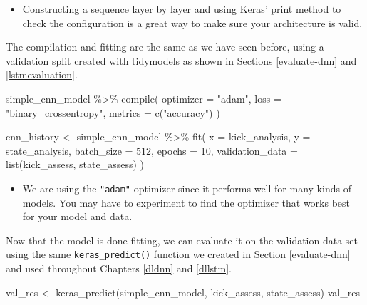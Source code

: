 \documentclass[
]{krantz}
\makeatletter
\newenvironment{Shaded}{\begin{snugshade}}{\end{snugshade}}
\newcommand{\AttributeTok}[1]{\textcolor[rgb]{0.77,0.63,0.00}{#1}}
\newcommand{\DecValTok}[1]{\textcolor[rgb]{0.00,0.00,0.81}{#1}}
\newcommand{\FunctionTok}[1]{\textcolor[rgb]{0.00,0.00,0.00}{#1}}
\newcommand{\NormalTok}[1]{#1}
\newcommand{\OtherTok}[1]{\textcolor[rgb]{0.56,0.35,0.01}{#1}}
\newcommand{\SpecialCharTok}[1]{\textcolor[rgb]{0.00,0.00,0.00}{#1}}
\newcommand{\StringTok}[1]{\textcolor[rgb]{0.31,0.60,0.02}{#1}}
\newenvironment{kframe}{%
\medskip{}
\setlength{\fboxsep}{.8em}
 \def\at@end@of@kframe{}%
 \ifinner\ifhmode%
  \def\at@end@of@kframe{\end{minipage}}%
  \begin{minipage}{\columnwidth}%
 \fi\fi%
 \def\FrameCommand##1{\hskip\@totalleftmargin \hskip-\fboxsep
 \colorbox{shadecolor}{##1}\hskip-\fboxsep
     \hskip-\linewidth \hskip-\@totalleftmargin \hskip\columnwidth}%
 \MakeFramed {\advance\hsize-\width
   \@totalleftmargin\z@ \linewidth\hsize
   \@setminipage}}%
 {\par\unskip\endMakeFramed%
 \at@end@of@kframe}
\renewenvironment{Shaded}{\begin{kframe}}{\end{kframe}}
\newenvironment{rmdblock}[1]
  {\begin{shaded*}
  \begin{itemize}[left = -1cm, labelsep = 1cm]
  \renewcommand{\labelitemi}{
    \raisebox{-.7\height}[0pt][0pt]{
      {\setkeys{Gin}{width=3em,keepaspectratio}\texttt{[image: images/\#1]}}
    }
  }
 
  \item
  }
  {
  \end{itemize}
  \end{shaded*}
  }
\newenvironment{rmdnote}
  {\begin{rmdblock}{note}}
  {\end{rmdblock}}
\makeatother
\begin{document}
\begin{rmdnote}
Constructing a sequence layer by layer and using Keras' print method to
check the configuration is a great way to make sure your architecture is
valid.
\end{rmdnote}

The compilation and fitting are the same as we have seen before, using a validation split created with tidymodels as shown in Sections \ref{evaluate-dnn} and \ref{lstmevaluation}.

\begin{Shaded}
\begin{Highlighting}[]
\NormalTok{simple\_cnn\_model }\SpecialCharTok{\%\textgreater{}\%} \FunctionTok{compile}\NormalTok{(}
  \AttributeTok{optimizer =} \StringTok{"adam"}\NormalTok{,}
  \AttributeTok{loss =} \StringTok{"binary\_crossentropy"}\NormalTok{,}
  \AttributeTok{metrics =} \FunctionTok{c}\NormalTok{(}\StringTok{"accuracy"}\NormalTok{)}
\NormalTok{)}

\NormalTok{cnn\_history }\OtherTok{\textless{}{-}}\NormalTok{ simple\_cnn\_model }\SpecialCharTok{\%\textgreater{}\%} \FunctionTok{fit}\NormalTok{(}
  \AttributeTok{x =}\NormalTok{ kick\_analysis,}
  \AttributeTok{y =}\NormalTok{ state\_analysis,}
  \AttributeTok{batch\_size =} \DecValTok{512}\NormalTok{,}
  \AttributeTok{epochs =} \DecValTok{10}\NormalTok{,}
  \AttributeTok{validation\_data =} \FunctionTok{list}\NormalTok{(kick\_assess, state\_assess)}
\NormalTok{)}
\end{Highlighting}
\end{Shaded}


\begin{rmdnote}
We are using the \texttt{"adam"} optimizer since it performs well for
many kinds of models. You may have to experiment to find the optimizer
that works best for your model and data.
\end{rmdnote}

Now that the model is done fitting, we can evaluate it on the validation data set using the same \texttt{keras\_predict()} function we created in Section \ref{evaluate-dnn} and used throughout Chapters \ref{dldnn} and \ref{dllstm}.

\begin{Shaded}
\begin{Highlighting}[]
\NormalTok{val\_res }\OtherTok{\textless{}{-}} \FunctionTok{keras\_predict}\NormalTok{(simple\_cnn\_model, kick\_assess, state\_assess)}
\NormalTok{val\_res}
\end{Highlighting}
\end{Shaded}
\end{document}
